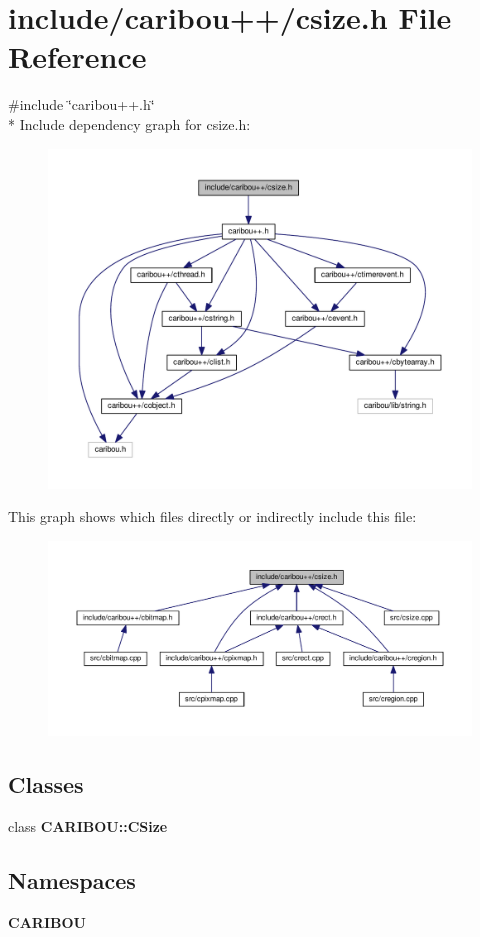 \section{include/caribou++/csize.h File Reference}
\label{csize_8h}
{\ttfamily \#include \char`\"{}caribou++.\-h\char`\"{}}\\*
Include dependency graph for csize.\-h\-:\nopagebreak
\begin{figure}[H]
\begin{center}
\leavevmode
\includegraphics[width=350pt]{csize_8h__incl}
\end{center}
\end{figure}
This graph shows which files directly or indirectly include this file\-:\nopagebreak
\begin{figure}[H]
\begin{center}
\leavevmode
\includegraphics[width=350pt]{csize_8h__dep__incl}
\end{center}
\end{figure}
\subsection*{Classes}
\begin{DoxyCompactItemize}
\item 
class {\bf C\-A\-R\-I\-B\-O\-U\-::\-C\-Size}
\end{DoxyCompactItemize}
\subsection*{Namespaces}
\begin{DoxyCompactItemize}
\item 
{\bf C\-A\-R\-I\-B\-O\-U}
\end{DoxyCompactItemize}
